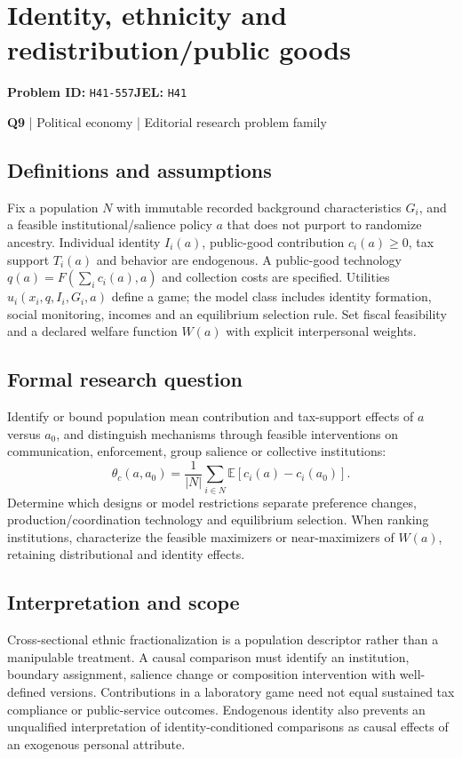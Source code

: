 \documentclass[11pt,a4paper]{article}
\begin{document}
\section*{Identity, ethnicity and redistribution/public goods}
\textbf{Problem ID:} \texttt{H41-557}\quad \textbf{JEL:} \texttt{H41}\par
\label{problem:OP-0129}
\label{atlas:prob:Q9}
{\sffamily\small\color{muted}\textbf{Q9} | Political economy | Editorial research problem family\par}
\subsection*{Definitions and assumptions}
Fix a population $N$ with immutable recorded background characteristics $G_i$, and a feasible institutional/salience policy $a$ that does not purport to randomize ancestry. Individual identity $I_i(a)$, public-good contribution $c_i(a)\geq0$, tax support $T_i(a)$ and behavior are endogenous. A public-good technology $q(a)=F(\sum_i c_i(a),a)$ and collection costs are specified. Utilities $u_i(x_i,q,I_i,G_i,a)$ define a game; the model class includes identity formation, social monitoring, incomes and an equilibrium selection rule. Set fiscal feasibility and a declared welfare function $W(a)$ with explicit interpersonal weights.
\subsection*{Formal research question}
Identify or bound population mean contribution and tax-support effects of $a$ versus $a_0$, and distinguish mechanisms through feasible interventions on communication, enforcement, group salience or collective institutions:
\[
\theta_c(a,a_0)=\frac1{|N|}\sum_{i\in N}\mathbb E[c_i(a)-c_i(a_0)].
\]
Determine which designs or model restrictions separate preference changes, production/coordination technology and equilibrium selection. When ranking institutions, characterize the feasible maximizers or near-maximizers of $W(a)$, retaining distributional and identity effects.
\subsection*{Interpretation and scope}
Cross-sectional ethnic fractionalization is a population descriptor rather than a manipulable treatment. A causal comparison must identify an institution, boundary assignment, salience change or composition intervention with well-defined versions. Contributions in a laboratory game need not equal sustained tax compliance or public-service outcomes. Endogenous identity also prevents an unqualified interpretation of identity-conditioned comparisons as causal effects of an exogenous personal attribute.
\end{document}

